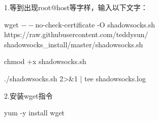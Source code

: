 \documentclass[11pt]{article}
\begin{document}
1.等到出现root@host等字样，输入以下文字：

wget $--$no-check-certificate -O shadowsocks.sh https://raw.githubusercontent.com/teddysun/
shadowsocks\_install/master/shadowsocks.sh

chmod +x shadowsocks.sh

./shadowsocks.sh 2>\&1 | tee shadowsocks.log

2.安装wget指令

yum -y install wget
\end{document}
